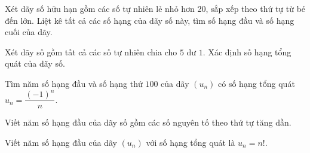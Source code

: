 \begin{bt}[NB]%
	Xét dãy số hữu hạn gồm các số tự nhiên lẻ nhỏ hơn 20, sắp xếp theo thứ tự từ bé đến lớn. Liệt kê tất cả các số hạng của dãy số này, tìm số hạng đầu và số hạng cuối của dãy. 
\end{bt}
\begin{bt}[TH]%
	Xét dãy số gồm tất cả các số tự nhiên chia cho $5$ dư $1$. Xác định số hạng tổng quát của dãy số.
\end{bt}
\begin{bt}[NB]%
	Tìm năm số hạng đầu và số hạng thứ $100$ của dãy $(u_n)$ có số hạng tổng quát $u_n= \dfrac{(-1)^n}{n}$.
\end{bt}
\begin{bt}[NB]%
	Viết năm số hạng đầu của dãy số gồm các số nguyên tố theo thứ tự tăng dần.
\end{bt}
\begin{bt}[NB]%
	Viết năm số hạng đầu của dãy $(u_n)$ với số hạng tổng quát là $u_n=n!$.
\end{bt}
